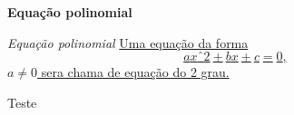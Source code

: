 \documentclass[a4paper, 12pt]{article}
\begin{document}
\begin{center}
 \textbf{Equação polinomial}

\end{center}

\begin{flushright}
\textit{Equação polinomial}
\underline{Uma equação da forma $$axˆ2 + bx + c = 0,$$ $a \neq 0$ sera chama de equação do 2 grau.}
\end{flushright}

\begin{flushleft}
Teste
\end{flushleft}
 
  
  
\end{document}
